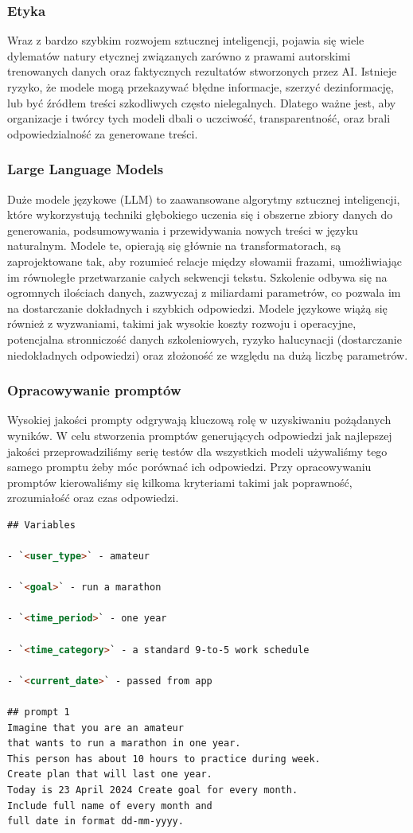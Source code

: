\subsubsection{Etyka}
Wraz z bardzo szybkim rozwojem sztucznej inteligencji, pojawia się wiele dylematów natury etycznej związanych zarówno z prawami autorskimi trenowanych danych oraz faktycznych rezultatów stworzonych przez AI. Istnieje ryzyko, że modele mogą przekazywać błędne informacje, szerzyć dezinformację, lub być źródłem treści szkodliwych często nielegalnych. Dlatego ważne jest, aby organizacje i twórcy tych modeli dbali o uczciwość, transparentność, oraz brali odpowiedzialność za generowane treści.

\subsubsection{Large Language Models}
Duże modele językowe (LLM) to zaawansowane algorytmy sztucznej inteligencji, które wykorzystują techniki głębokiego uczenia się i obszerne zbiory danych do generowania, podsumowywania i przewidywania nowych treści w języku naturalnym. Modele te, opierają się głównie na transformatorach, są zaprojektowane tak, aby rozumieć relacje między słowami\linebreak i frazami, umożliwiając im równoległe przetwarzanie całych sekwencji tekstu. Szkolenie odbywa się na ogromnych ilościach danych, zazwyczaj z miliardami parametrów, co pozwala im na dostarczanie dokładnych i szybkich odpowiedzi. Modele językowe wiążą się również z wyzwaniami, takimi jak wysokie koszty rozwoju i operacyjne, potencjalna stronniczość danych szkoleniowych, ryzyko halucynacji (dostarczanie niedokładnych odpowiedzi) oraz złożoność ze względu na dużą liczbę parametrów.

\subsubsection{Opracowywanie promptów}
Wysokiej jakości prompty odgrywają kluczową rolę w uzyskiwaniu pożądanych wyników. W celu stworzenia promptów generujących odpowiedzi jak najlepszej jakości przeprowadziliśmy serię testów dla wszystkich modeli używaliśmy tego samego promptu żeby móc porównać ich odpowiedzi. Przy opracowywaniu promptów kierowaliśmy się kilkoma kryteriami takimi jak poprawność, zrozumiałość oraz czas odpowiedzi.  
\begin{lstlisting}[language=html, caption=Początkowa wersja prompta, linewidth=140mm]
## Variables

- `<user_type>` - amateur

- `<goal>` - run a marathon

- `<time_period>` - one year

- `<time_category>` - a standard 9-to-5 work schedule

- `<current_date>` - passed from app

## prompt 1
Imagine that you are an amateur
that wants to run a marathon in one year. 
This person has about 10 hours to practice during week. 
Create plan that will last one year. 
Today is 23 April 2024 Create goal for every month. 
Include full name of every month and 
full date in format dd-mm-yyyy.
\end{lstlisting}

